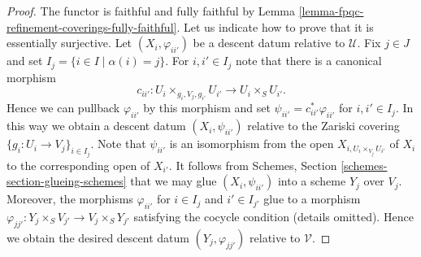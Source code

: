 \documentclass{stacks-project}
\theoremstyle{plain}
\theoremstyle{definition}
\theoremstyle{remark}
\numberwithin{equation}{subsection}
\begin{document}
\begin{proof}
The functor is faithful and fully faithful by
Lemma \ref{lemma-fpqc-refinement-coverings-fully-faithful}.
Let us indicate how to prove that it is essentially surjective.
Let $(X_i, \varphi_{ii'})$ be a descent datum relative to $\mathcal{U}$.
Fix $j \in J$ and set $I_j = \{i \in I \mid \alpha(i) = j\}$.
For $i, i' \in I_j$ note that there is a canonical morphism
$$
c_{ii'} : U_i \times_{g_i, V_j, g_{i'}} U_{i'} \to U_i \times_S U_{i'}.
$$
Hence we can pullback $\varphi_{ii'}$ by this morphism
and set $\psi_{ii'} = c_{ii'}^*\varphi_{ii'}$ for $i, i' \in I_j$.
In this way we obtain a descent datum $(X_i, \psi_{ii'})$
relative to the Zariski covering
$\{g_i : U_i \to V_j\}_{i \in I_j}$.
Note that $\psi_{ii'}$ is an isomorphism from the open
$X_{i, U_i \times_{V_j} U_{i'}}$ of $X_i$ to the corresponding
open of $X_{i'}$. It follows from
Schemes, Section \ref{schemes-section-glueing-schemes}
that we may glue $(X_i, \psi_{ii'})$ into a scheme
$Y_j$ over $V_j$. Moreover, the morphisms $\varphi_{ii'}$
for $i \in I_j$ and $i' \in I_{j'}$ glue to a morphism
$\varphi_{jj'} : Y_j \times_S V_{j'} \to V_j \times_S Y_{j'}$
satisfying the cocycle condition (details omitted).
Hence we obtain the desired descent datum
$(Y_j, \varphi_{jj'})$ relative to $\mathcal{V}$.
\end{proof}
\end{document}

